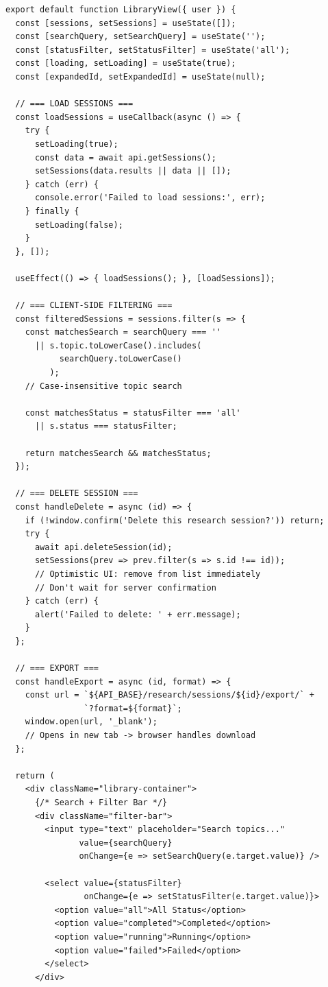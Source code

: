 \documentclass[11pt,a4paper,twoside]{report}
\begin{document}
\begin{lstlisting}[style=jsstyle,caption={LibraryView.jsx --- Search and Filter Logic}]
export default function LibraryView({ user }) {
  const [sessions, setSessions] = useState([]);
  const [searchQuery, setSearchQuery] = useState('');
  const [statusFilter, setStatusFilter] = useState('all');
  const [loading, setLoading] = useState(true);
  const [expandedId, setExpandedId] = useState(null);

  // === LOAD SESSIONS ===
  const loadSessions = useCallback(async () => {
    try {
      setLoading(true);
      const data = await api.getSessions();
      setSessions(data.results || data || []);
    } catch (err) {
      console.error('Failed to load sessions:', err);
    } finally {
      setLoading(false);
    }
  }, []);

  useEffect(() => { loadSessions(); }, [loadSessions]);

  // === CLIENT-SIDE FILTERING ===
  const filteredSessions = sessions.filter(s => {
    const matchesSearch = searchQuery === ''
      || s.topic.toLowerCase().includes(
           searchQuery.toLowerCase()
         );
    // Case-insensitive topic search

    const matchesStatus = statusFilter === 'all'
      || s.status === statusFilter;

    return matchesSearch && matchesStatus;
  });

  // === DELETE SESSION ===
  const handleDelete = async (id) => {
    if (!window.confirm('Delete this research session?')) return;
    try {
      await api.deleteSession(id);
      setSessions(prev => prev.filter(s => s.id !== id));
      // Optimistic UI: remove from list immediately
      // Don't wait for server confirmation
    } catch (err) {
      alert('Failed to delete: ' + err.message);
    }
  };

  // === EXPORT ===
  const handleExport = async (id, format) => {
    const url = `${API_BASE}/research/sessions/${id}/export/` +
                `?format=${format}`;
    window.open(url, '_blank');
    // Opens in new tab -> browser handles download
  };

  return (
    <div className="library-container">
      {/* Search + Filter Bar */}
      <div className="filter-bar">
        <input type="text" placeholder="Search topics..."
               value={searchQuery}
               onChange={e => setSearchQuery(e.target.value)} />

        <select value={statusFilter}
                onChange={e => setStatusFilter(e.target.value)}>
          <option value="all">All Status</option>
          <option value="completed">Completed</option>
          <option value="running">Running</option>
          <option value="failed">Failed</option>
        </select>
      </div>


\end{lstlisting}
\end{document}
